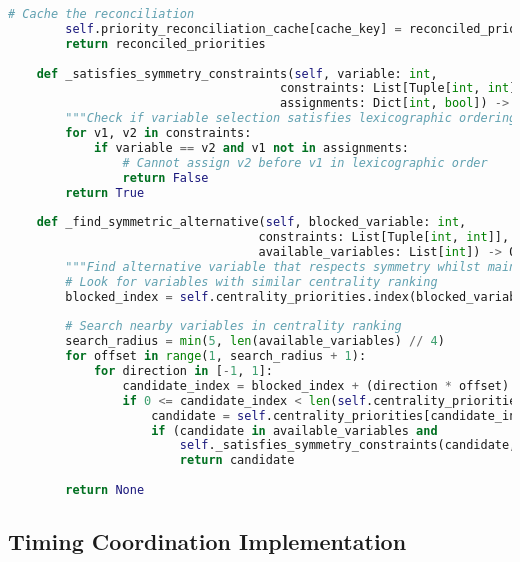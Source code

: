 \begin{lstlisting}[language=Python, caption=Symmetry Breaking Integration for Predictable Behaviour]
        # Cache the reconciliation
        self.priority_reconciliation_cache[cache_key] = reconciled_priorities
        return reconciled_priorities
    
    def _satisfies_symmetry_constraints(self, variable: int, 
                                      constraints: List[Tuple[int, int]],
                                      assignments: Dict[int, bool]) -> bool:
        """Check if variable selection satisfies lexicographic ordering constraints"""
        for v1, v2 in constraints:
            if variable == v2 and v1 not in assignments:
                # Cannot assign v2 before v1 in lexicographic order
                return False
        return True
    
    def _find_symmetric_alternative(self, blocked_variable: int,
                                   constraints: List[Tuple[int, int]],
                                   available_variables: List[int]) -> Optional[int]:
        """Find alternative variable that respects symmetry whilst maintaining centrality benefits"""
        # Look for variables with similar centrality ranking
        blocked_index = self.centrality_priorities.index(blocked_variable)
        
        # Search nearby variables in centrality ranking
        search_radius = min(5, len(available_variables) // 4)
        for offset in range(1, search_radius + 1):
            for direction in [-1, 1]:
                candidate_index = blocked_index + (direction * offset)
                if 0 <= candidate_index < len(self.centrality_priorities):
                    candidate = self.centrality_priorities[candidate_index]
                    if (candidate in available_variables and 
                        self._satisfies_symmetry_constraints(candidate, constraints, {})):
                        return candidate
        
        return None
\end{lstlisting}

\subsection{Timing Coordination Implementation}
\label{appendix:timing-coordination}

